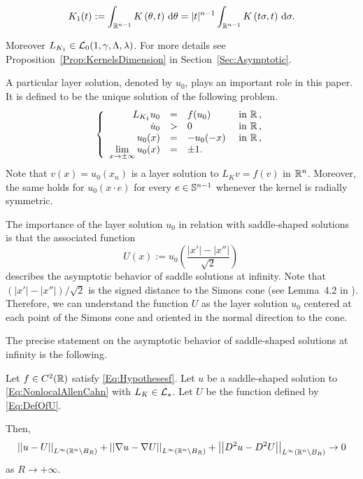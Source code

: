 $$K_1(t) := \int_{\mathbb{R}^{n-1}} K\left(\theta,t\right) \,\mathrm{d} \theta = |t|^{n-1} \int_{\mathbb{R}^{n-1}} K\left(t\sigma,t\right) \,\mathrm{d} \sigma.$$

Moreover $L_{K_1}\in \mathcal{L}_0(1,\gamma,\Lambda, \lambda)$. For more details see Proposition~\ref{Prop:KernelsDimension} in Section~\ref{Sec:Asymptotic}. 

A particular layer solution, denoted by $u_0$, plays an important role in this paper. It is defined to be the unique solution of the following problem.
\begin{equation}
\label{Eq:LayerSolution}
\left\{\begin{array}{rcll}
L_{K_1}  u_0 &=& f(u_0) & \textrm{ in }\mathbb{R}\,,\\
\dot{u}_0 &>& 0 & \textrm{ in } \mathbb{R}\,,\\
u_0(x) & = &-u_0(-x)  & \textrm{ in }\mathbb{R}\,,\\
\displaystyle \lim_{x \to \pm \infty} u_0(x) &=& \pm 1. & 
\end{array} \right.
\end{equation}
Note that $v(x) = u_0(x_n)$ is a layer solution to $L_K v = f(v)$ in $\mathbb{R}^n$. Moreover, the same holds for $u_0(x\cdot e)$ for every $e\in \mathbb{S}^{n-1}$ whenever the kernel is radially symmetric.

The importance of the layer solution $u_0$ in relation with saddle-shaped solutions is that the associated function
\begin{equation}
\label{Eq:DefOfU}
U(x):= u_0 \left( \dfrac{|x'| - |x''|}{\sqrt{2}} \right)\,
\end{equation}
describes the asymptotic behavior of saddle solutions at infinity. Note that $(|x'| - |x''| )/\sqrt{2}$ is the signed distance to the Simons cone (see Lemma~4.2 in \cite{CabreTerraII}). Therefore, we can understand the function $U$ as the layer solution $u_0$ centered at each point of the Simons cone and oriented in the normal direction to the cone.

The precise statement on the asymptotic behavior of saddle-shaped solutions at infinity is the following.

\begin{theorem}
	\label{Th:AsymptoticBehaviorSaddleSolution}
	Let $f\in C^2(\mathbb{R})$ satisfy \eqref{Eq:Hypothesesf}. Let $u$ be a saddle-shaped solution to \eqref{Eq:NonlocalAllenCahn} with $L_K \in \mathcal{L}_\star$. Let $U$ be the function defined by \eqref{Eq:DefOfU}.
	
	Then,
	$$
	\left | \left |{u-U} \right | \right |_{L^\infty(\mathbb{R}^n\setminus B_R)}
	+\left | \left |{\nabla u-\nabla U} \right | \right |_{L^\infty(\mathbb{R}^n\setminus B_R)}
	+\left | \left |{D^2u-D^2U} \right | \right |_{L^\infty(\mathbb{R}^n\setminus B_R)} \to 0
	$$
	as $ R\to +\infty$.
\end{theorem}

